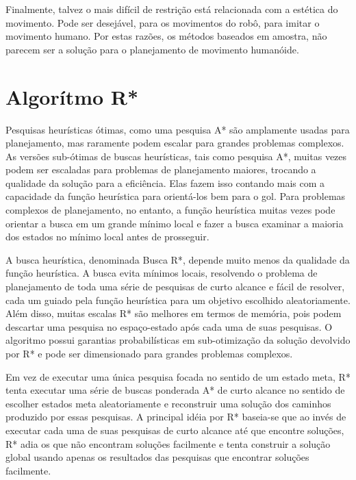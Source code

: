 \documentclass[font=plain]{abnt}
\begin{document}
Finalmente, talvez o mais difícil de restrição está relacionada com a estética do movimento. Pode ser desejável, para os movimentos 
do robô, para imitar o movimento humano. Por estas razões, os métodos baseados em amostra, não parecem ser a solução para o planejamento
de movimento humanóide.

\section{Algorítmo R*}

Pesquisas heurísticas ótimas, como uma pesquisa A* são amplamente usadas para planejamento, mas raramente podem escalar para grandes problemas complexos. 
As versões sub-ótimas de buscas heurísticas, tais como pesquisa A*, muitas vezes podem ser escaladas para problemas de planejamento maiores, trocando 
a qualidade da solução para a eficiência. Elas fazem isso contando mais com a capacidade da função heurística para orientá-los bem para o gol. Para
problemas complexos de planejamento, no entanto, a função heurística muitas vezes pode orientar a busca em um grande mínimo local e fazer a busca 
examinar a maioria dos estados no mínimo local antes de prosseguir.

A busca heurística, denominada Busca R*\cite{plikhachev}, depende muito menos da qualidade da função heurística. A busca evita mínimos locais, resolvendo
o problema de planejamento de toda uma série de pesquisas de curto alcance e fácil de resolver, cada um guiado pela função heurística para um objetivo
escolhido aleatoriamente. Além disso, muitas escalas R* são melhores em termos de memória, pois podem descartar uma pesquisa no espaço-estado após 
cada uma de suas pesquisas. O algoritmo possui garantias probabilísticas em sub-otimização da solução devolvido por R* e pode ser dimensionado para
grandes problemas complexos.

Em vez de executar uma única pesquisa focada no sentido de um estado meta, R* tenta executar uma série de buscas ponderada A* de curto alcance no sentido 
de escolher estados meta aleatoriamente e reconstruir uma solução dos caminhos produzido por essas pesquisas. A principal idéia por R* baseia-se que ao 
invés de executar cada uma de suas pesquisas de curto alcance até que encontre soluções, R* adia os que não encontram soluções facilmente e tenta construir
a solução global usando apenas os resultados das pesquisas que encontrar soluções facilmente. 
\end{document}

